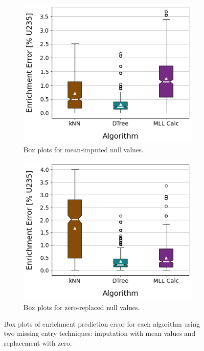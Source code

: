 \begin{figure}[!htb]
  \centering
  \begin{subfigure}[b]{0.49\textwidth}
    \centering
    \includegraphics[width=\textwidth]{./chapters/exp1/sfcompo_boxplots_impnull_enri.png}
    \caption{Box plots for mean-imputed null values.}
    \label{fig:enriimp}
  \end{subfigure}
  \hfill
  \begin{subfigure}[b]{0.49\textwidth}
    \centering
    \includegraphics[width=\textwidth]{./chapters/exp1/sfcompo_boxplots_0null_enri.png}
    \caption{Box plots for zero-replaced null values.}
    \label{fig:enri0}
  \end{subfigure}
  \caption{Box plots of enrichment prediction error for each algorithm 
           using two missing entry techniques: imputation with mean values 
           and replacement with zero.}
  \label{fig:sfcoenri}
\end{figure}

